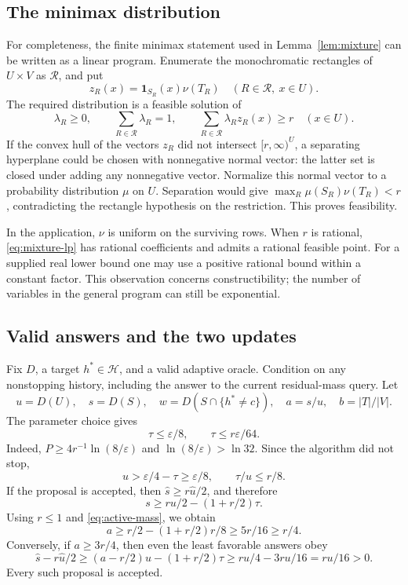 \documentclass[11pt,letterpaper,pmlr,twoside]{jmlr}
\newcommand{\Hc}{\mathcal H}
\newcommand{\Rc}{\mathcal R}
\newcommand{\one}{\mathbf 1}
\newcommand{\eps}{\varepsilon}
\begin{document}
\subsection{The minimax distribution}
For completeness, the finite minimax statement used in Lemma~\ref{lem:mixture} can be written as a linear program. Enumerate the monochromatic rectangles of $U\times V$ as $\Rc$, and put
\[
 z_R(x)=\one_{S_R}(x)\nu(T_R)\quad(R\in\Rc,\ x\in U).
\]
The required distribution is a feasible solution of
\begin{equation}
 \lambda_R\ge0,\qquad \sum_{R\in\Rc}\lambda_R=1,
 \qquad \sum_{R\in\Rc}\lambda_R z_R(x)\ge r\quad(x\in U).
\label{eq:mixture-lp}
\end{equation}
If the convex hull of the vectors $z_R$ did not intersect $[r,\infty)^U$, a separating hyperplane could be chosen with nonnegative normal vector: the latter set is closed under adding any nonnegative vector. Normalize this normal vector to a probability distribution $\mu$ on $U$. Separation would give $\max_R\mu(S_R)\nu(T_R)<r$, contradicting the rectangle hypothesis on the restriction. This proves feasibility.

In the application, $\nu$ is uniform on the surviving rows. When $r$ is rational, \eqref{eq:mixture-lp} has rational coefficients and admits a rational feasible point. For a supplied real lower bound one may use a positive rational bound within a constant factor. This observation concerns constructibility; the number of variables in the general program can still be exponential.

\subsection{Valid answers and the two updates}
Fix $D$, a target $h^*\in\Hc$, and a valid adaptive oracle. Condition on any nonstopping history, including the answer to the current residual-mass query. Let
\[
 u=D(U),\quad s=D(S),\quad
 w=D(S\cap\{h^*\ne c\}),\quad
 a=s/u,\quad b=|T|/|V|.
\]
The parameter choice gives
\begin{equation}
 \tau\le\eps/8,\qquad \tau\le r\eps/64.
\label{eq:tau-small}
\end{equation}
Indeed, $P\ge4r^{-1}\ln(8/\eps)$ and $\ln(8/\eps)>\ln32$. Since the algorithm did not stop,
\begin{equation}
 u>\eps/4-\tau\ge\eps/8,
 \qquad \tau/u\le r/8.
\label{eq:active-mass}
\end{equation}
If the proposal is accepted, then $\hat s\ge r\hat u/2$, and therefore
\[
 s\ge ru/2-(1+r/2)\tau.
\]
Using $r\le1$ and \eqref{eq:active-mass}, we obtain
\begin{equation}
 a\ge r/2-(1+r/2)r/8\ge5r/16\ge r/4.
\label{eq:accepted-mass}
\end{equation}
Conversely, if $a\ge3r/4$, then even the least favorable answers obey
\[
 \hat s-r\hat u/2
 \ge (a-r/2)u-(1+r/2)\tau
 \ge ru/4-3ru/16=ru/16>0.
\]
Every such proposal is accepted.
\end{document}
